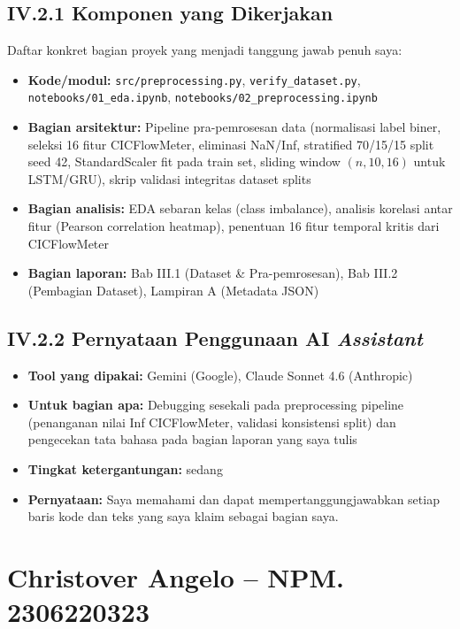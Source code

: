 \documentclass[11pt,a4paper,oneside]{report}
\begin{document}
\subsection*{IV.2.1 Komponen yang Dikerjakan}
Daftar konkret bagian proyek yang menjadi tanggung jawab penuh saya:
\begin{itemize}[leftmargin=*]
    \item \textbf{Kode/modul:} \texttt{src/preprocessing.py}, \texttt{verify\_dataset.py}, \texttt{notebooks/01\_eda.ipynb}, \texttt{notebooks/02\_preprocessing.ipynb}
    \item \textbf{Bagian arsitektur:} Pipeline pra-pemrosesan data (normalisasi label biner, seleksi 16 fitur CICFlowMeter, eliminasi NaN/Inf, stratified 70/15/15 split seed 42, StandardScaler fit pada train set, sliding window $(n, 10, 16)$ untuk LSTM/GRU), skrip validasi integritas dataset splits
    \item \textbf{Bagian analisis:} EDA sebaran kelas (class imbalance), analisis korelasi antar fitur (Pearson correlation heatmap), penentuan 16 fitur temporal kritis dari CICFlowMeter
    \item \textbf{Bagian laporan:} Bab III.1 (Dataset \& Pra-pemrosesan), Bab III.2 (Pembagian Dataset), Lampiran A (Metadata JSON)
\end{itemize}

\subsection*{IV.2.2 Pernyataan Penggunaan AI \textit{Assistant}}
\begin{itemize}[leftmargin=*]
    \item \textbf{Tool yang dipakai:} Gemini (Google), Claude Sonnet 4.6 (Anthropic)
    \item \textbf{Untuk bagian apa:} Debugging sesekali pada preprocessing pipeline (penanganan nilai Inf CICFlowMeter, validasi konsistensi split) dan pengecekan tata bahasa pada bagian laporan yang saya tulis
    \item \textbf{Tingkat ketergantungan:} sedang
    \item \textbf{Pernyataan:} Saya memahami dan dapat mempertanggungjawabkan setiap baris kode dan teks yang saya klaim sebagai bagian saya.
\end{itemize}

\section{Christover Angelo -- NPM. 2306220323}
\end{document}

